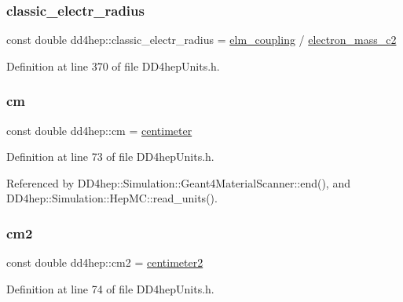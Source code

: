 \subsubsection{\texorpdfstring{classic\+\_\+electr\+\_\+radius}{classic\_electr\_radius}}
{\footnotesize\ttfamily const double dd4hep\+::classic\+\_\+electr\+\_\+radius = \hyperlink{namespacedd4hep_ace30ae02d909a752d5e3f2138bf4ecb1}{elm\+\_\+coupling} / \hyperlink{namespacedd4hep_a90fb8853ce4da9b13bd108593b2d154d}{electron\+\_\+mass\+\_\+c2}\hspace{0.3cm}{\ttfamily [static]}}



Definition at line 370 of file D\+D4hep\+Units.\+h.

\hypertarget{namespacedd4hep_a1f3cfefacfa8c2174102824c534c71b8}{}\label{namespacedd4hep_a1f3cfefacfa8c2174102824c534c71b8} 
\subsubsection{\texorpdfstring{cm}{cm}}
{\footnotesize\ttfamily const double dd4hep\+::cm = \hyperlink{namespacedd4hep_af17522b334712876a204971dee26c063}{centimeter}\hspace{0.3cm}{\ttfamily [static]}}



Definition at line 73 of file D\+D4hep\+Units.\+h.



Referenced by D\+D4hep\+::\+Simulation\+::\+Geant4\+Material\+Scanner\+::end(), and D\+D4hep\+::\+Simulation\+::\+Hep\+M\+C\+::read\+\_\+units().

\hypertarget{namespacedd4hep_aaa4f14a45d39e83ade706dcfce865a35}{}\label{namespacedd4hep_aaa4f14a45d39e83ade706dcfce865a35} 
\subsubsection{\texorpdfstring{cm2}{cm2}}
{\footnotesize\ttfamily const double dd4hep\+::cm2 = \hyperlink{namespacedd4hep_a43a537cf81dbb2fb1476264a37bb3945}{centimeter2}\hspace{0.3cm}{\ttfamily [static]}}



Definition at line 74 of file D\+D4hep\+Units.\+h.

\hypertarget{namespacedd4hep_a6464c11bda4aa7d6c4d42f70dbcaf803}{}\label{namespacedd4hep_a6464c11bda4aa7d6c4d42f70dbcaf803} 
